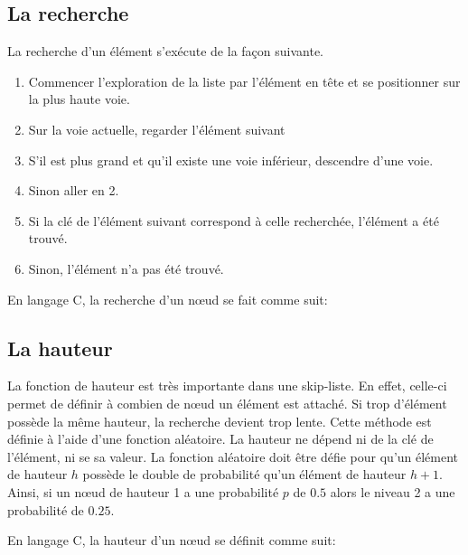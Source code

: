 \documentclass[hidelinks,a4paper, 12pt]{article}
\begin{document}
	\subsection{La recherche}
	La recherche d'un élément s'exécute de la façon suivante.
	\begin{enumerate}
		\item Commencer l'exploration de la liste par l'élément en tête et se positionner sur la plus haute voie.
		\item Sur la voie actuelle, regarder l'élément suivant
		\item S'il est plus grand et qu'il existe une voie inférieur, descendre d'une voie.
		\item Sinon aller en 2.
		\item Si la clé de l'élément suivant correspond à celle recherchée, l'élément a été trouvé.
		\item Sinon, l'élément n'a pas été trouvé.
	\end{enumerate}
	En langage C, la recherche d'un nœud se fait comme suit:
	
	
	\subsection{La hauteur}
	La fonction de hauteur est très importante dans une skip-liste. En effet, celle-ci permet de définir à combien de nœud un élément est attaché. Si trop d'élément possède la même hauteur, la recherche devient trop lente.	Cette méthode est définie à l'aide d'une fonction aléatoire. La hauteur ne dépend ni de la clé de l'élément, ni se sa valeur. La fonction aléatoire doit être défie pour qu'un élément de hauteur $h$ possède le double de probabilité qu'un élément de hauteur $h+1$. Ainsi, si un nœud de hauteur 1 a une probabilité $p$ de $0.5$ alors le niveau 2 a une probabilité de $0.25$.
	
	En langage C, la hauteur d'un nœud se définit comme suit:
	
	
\end{document}
